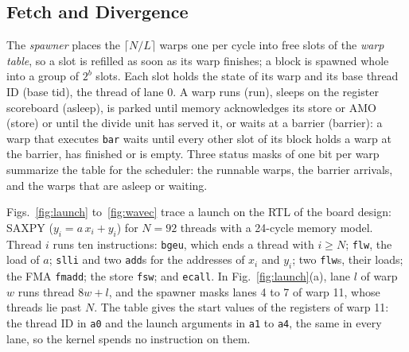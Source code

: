\documentclass[journal]{IEEEtran}
\begin{document}
\subsection{Fetch and Divergence}
The \emph{spawner} places the $\lceil N/L\rceil$ warps one per cycle into free slots of
the \emph{warp table}, so a slot is refilled as soon as its warp finishes; a block is
spawned whole into a group of $2^b$ slots. Each slot holds the state of its warp and
its base thread ID (base tid), the thread of lane 0. A warp runs (run), sleeps on the
register scoreboard (asleep), is parked until memory acknowledges its store or AMO
(store) or until the divide unit has served it, or waits at a barrier (barrier): a warp
that executes \texttt{bar} waits until every other slot of its block holds a warp at
the barrier, has finished or is empty. Three status masks of one bit per warp
summarize the table for the scheduler: the runnable warps, the barrier arrivals, and
the warps that are asleep or waiting.

Figs.~\ref{fig:launch} to~\ref{fig:wavec} trace a launch on the RTL of the board design:
SAXPY ($y_i=a\,x_i+y_i$) for $N=92$ threads with a 24-cycle memory model. Thread $i$
runs ten instructions: \texttt{bgeu}, which ends a thread with $i\ge N$; \texttt{flw},
the load of $a$; \texttt{slli} and two \texttt{add}s for the addresses of $x_i$ and
$y_i$; two \texttt{flw}s, their loads; the FMA \texttt{fmadd}; the store \texttt{fsw};
and \texttt{ecall}. In Fig.~\ref{fig:launch}(a), lane $l$ of warp $w$ runs thread
$8w+l$, and the spawner masks lanes 4 to 7 of warp 11, whose threads lie past $N$. The
table gives the start values of the registers of warp 11: the thread ID in \texttt{a0}
and the launch arguments in \texttt{a1} to \texttt{a4}, the same in every lane, so the
kernel spends no instruction on them.
\end{document}

